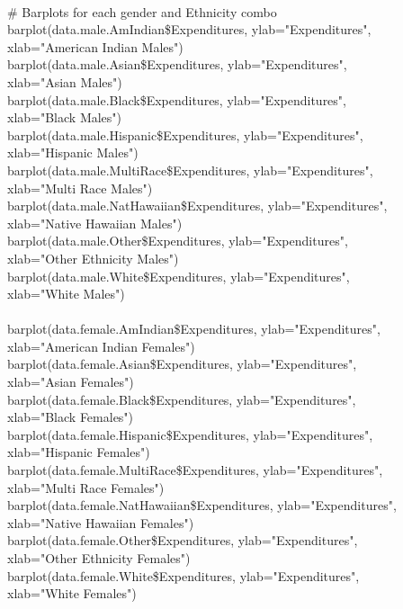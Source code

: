 \documentclass[12pt,letterpaper]{article}
\begin{document}
{		\ \\
		\# Barplots for each gender and Ethnicity combo\\
		barplot(data.male.AmIndian\$Expenditures, ylab="Expenditures",\\
		\indent xlab="American Indian Males")\\
		barplot(data.male.Asian\$Expenditures, ylab="Expenditures",\\
		\indent xlab="Asian Males")\\
		barplot(data.male.Black\$Expenditures, ylab="Expenditures",\\
		\indent xlab="Black Males")\\
		barplot(data.male.Hispanic\$Expenditures, ylab="Expenditures",\\
		\indent xlab="Hispanic Males")\\
		barplot(data.male.MultiRace\$Expenditures, ylab="Expenditures",\\
		\indent xlab="Multi Race Males")\\
		barplot(data.male.NatHawaiian\$Expenditures, ylab="Expenditures",\\
		\indent xlab="Native Hawaiian Males")\\
		barplot(data.male.Other\$Expenditures, ylab="Expenditures",\\
		\indent xlab="Other Ethnicity Males")\\
		barplot(data.male.White\$Expenditures, ylab="Expenditures",\\
		\indent xlab="White Males")\\
		\ \\
		barplot(data.female.AmIndian\$Expenditures, ylab="Expenditures",\\
		\indent xlab="American Indian Females")\\
		barplot(data.female.Asian\$Expenditures, ylab="Expenditures",\\
		\indent xlab="Asian Females")\\
		barplot(data.female.Black\$Expenditures, ylab="Expenditures",\\
		\indent xlab="Black Females")\\
		barplot(data.female.Hispanic\$Expenditures, ylab="Expenditures",\\
		\indent xlab="Hispanic Females")\\
		barplot(data.female.MultiRace\$Expenditures, ylab="Expenditures",\\
		\indent xlab="Multi Race Females")\\
		barplot(data.female.NatHawaiian\$Expenditures, ylab="Expenditures",\\
		\indent xlab="Native Hawaiian Females")\\
		barplot(data.female.Other\$Expenditures, ylab="Expenditures",\\
		\indent xlab="Other Ethnicity Females")\\
		barplot(data.female.White\$Expenditures, ylab="Expenditures",\\
		\indent xlab="White Females")\\
		\ \\
	}
	
\end{document}
